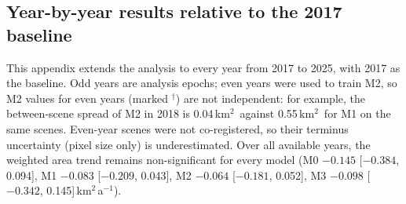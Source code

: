 \documentclass[pdflatex,sn-mathphys-num]{sn-jnl}%
\theoremstyle{thmstyleone}%
\theoremstyle{thmstyletwo}%
\theoremstyle{thmstylethree}%
\newcommand{\kmsq}{km$^2$}
\newcommand{\kmsqa}{km$^2$\,a$^{-1}$}
\begin{document}
\begin{appendices}

\section{Year-by-year results relative to the 2017 baseline}\label{secA1}

This appendix extends the analysis to every year from 2017 to 2025, with 2017 as the baseline. Odd years are analysis epochs; even years were used to train M2, so M2 values for even years (marked $^\dagger$) are not independent: for example, the between-scene spread of M2 in 2018 is 0.04\,\kmsq\ against 0.55\,\kmsq\ for M1 on the same scenes. Even-year scenes were not co-registered, so their terminus uncertainty (pixel size only) is underestimated. Over all available years, the weighted area trend remains non-significant for every model (M0 $-0.145$ [$-0.384$, 0.094], M1 $-0.083$ [$-0.209$, 0.043], M2 $-0.064$ [$-0.181$, 0.052], M3 $-0.098$ [$-0.342$, 0.145]\,\kmsqa).


\end{appendices}
\end{document}
